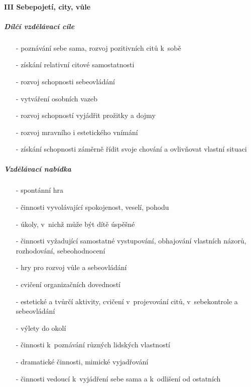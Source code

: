				\paragraph{III Sebepojetí, city, vůle}
				
					\subparagraph{Dílčí vzdělávací cíle}

					\begin{itemize}
					\setlength\itemsep{-2mm}
						\item[-]poznávání sebe sama, rozvoj pozitivních citů k~sobě
						\item[-]získání relativní citové samostatnosti
						\item[-]rozvoj schopnosti sebeovládání
						\item[-]vytváření osobních vazeb
						\item[-]rozvoj schopností vyjádřit prožitky a dojmy
						\item[-]rozvoj mravního i estetického vnímání
						\item[-]získání schopnosti záměrně řídit svoje chování a ovlivňovat vlastní situaci
					\end{itemize}

					\subparagraph{Vzdělávací nabídka}
					
					\begin{itemize}
					\setlength\itemsep{-2mm}
						\item[-]spontánní hra
						\item[-]činnosti vyvolávající spokojenost, veselí, pohodu
						\item[-]úkoly, v~nichž může být dítě úspěšné
						\item[-]činnosti vyžadující samostatné vystupování, obhajování vlastních názorů, rozhodování, sebeohodnocení
						\item[-]hry pro rozvoj vůle a sebeovládání
						\item[-]cvičení organizačních dovedností
						\item[-]estetické a tvůrčí aktivity, cvičení v~projevování citů, v~sebekontrole a sebeovládání
						\item[-]výlety do okolí
						\item[-]činnosti k~poznávání různých lidských vlastností
						\item[-]dramatické činnosti, mimické vyjadřování
						\item[-]činnosti vedoucí k~vyjádření sebe sama a k~odlišení od ostatních
					\end{itemize}
					
